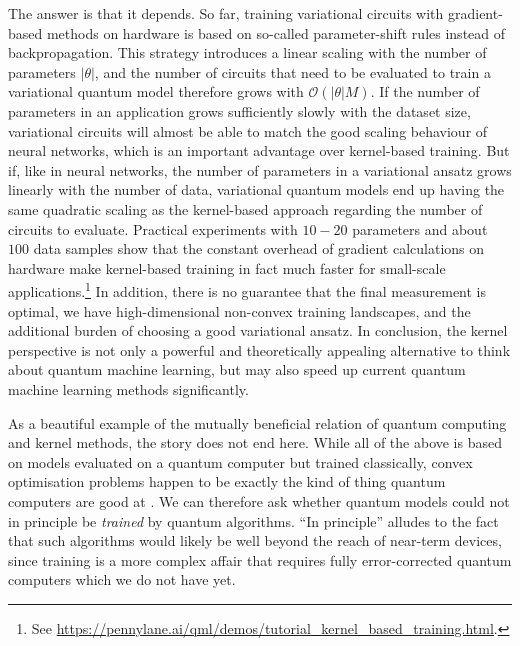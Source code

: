 \documentclass[aps, reprint, onecolumn, nofootinbib, longbibliography]{revtex4-2}
\begin{document}
The answer is that it depends. So far, training variational circuits with gradient-based methods on hardware is based on so-called parameter-shift rules \cite{mitarai2018quantum, schuld2019evaluating} instead of backpropagation. This strategy introduces a linear scaling with the number of parameters $|\theta|$, and the number of circuits that need to be evaluated to train a variational quantum model therefore grows with $\mathcal{O}(|\theta| M)$. If the number of parameters in an application grows sufficiently slowly with the dataset size, variational circuits will almost be able to match the good scaling behaviour of neural networks, which is an important advantage over kernel-based training. But if, like in neural networks, the number of parameters in a variational ansatz grows linearly with the number of data, variational quantum models end up having the same quadratic scaling as the kernel-based approach regarding the number of circuits to evaluate. Practical experiments with $10-20$ parameters and about $100$ data samples show that the constant overhead of gradient calculations on hardware make kernel-based training in fact much faster for small-scale applications.\footnote{See \url{https://pennylane.ai/qml/demos/tutorial_kernel_based_training.html}.} In addition, there is  no guarantee that the final measurement is optimal, we have high-dimensional non-convex training landscapes, and the additional burden of choosing a good variational ansatz. In conclusion, the kernel perspective is not only a powerful and theoretically appealing alternative to think about quantum machine learning, but may also speed up current quantum machine learning methods significantly. 

As a beautiful example of the mutually beneficial relation of quantum computing and kernel methods, the story does not end here. While all of the above is based on models evaluated on a quantum computer but trained classically, convex optimisation problems happen to be exactly the kind of thing quantum computers are good at \citep{harrow2009quantum}. We can therefore ask whether quantum models could not in principle be \textit{trained} by quantum algorithms. ``In principle'' alludes to the fact that such algorithms would likely be well beyond the reach of near-term devices, since training is a more complex affair that requires fully error-corrected quantum computers which we do not have yet.
\end{document}
